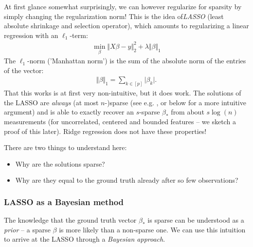 \documentclass{article}
\newcommand{\abs}[1]{\vert #1 \vert}
\newcommand{\norm}[1]{\Vert #1 \Vert}
\begin{document}
At first glance somewhat surprisingly, we can however regularize for sparsity by simply changing the regularization norm! This is the idea of\emph{LASSO} (least absolute shrinkage and selection operator), which amounts to regularizing a linear regression with an $\ell_1$-term:
\begin{align} \label{eq:lasso}
    \min_{\beta} \norm{X\beta-y}_2^2 + \lambda \norm{\beta}_1
\end{align}
The $\ell_1$-norm ('Manhattan norm') is the sum of the absolute norm of the entries of the vector:
\begin{align*}
    \norm{\beta}_1 = \sum_{k \in [p]} \abs{\beta_k}.
\end{align*}
That this works is at first very non-intuitive, but it does work. The solutions of the LASSO are \emph{always} (at most $n$-)sparse (see e.g. \cite[Th.6]{UnserStructure}, or below for a more intuitive argument) and is able to exactly recover an $s$-sparse $\beta_*$ from about $s\log(n)$ measurements (for uncorrelated, centered and bounded features -- we sketch a proof of this later). Ridge regression does not have these properties!

There are two things to understand here: 
\begin{itemize}
    \item Why are the solutions sparse?
    \item Why are they equal to the ground truth already after so few observations?
\end{itemize}

\subsubsection{LASSO as a Bayesian method} The knowledge that the ground truth vector $\beta_*$ is sparse can be understood as a \emph{prior} -- a sparse $\beta$ is more likely than a non-sparse one. We can use this intuition to arrive at the LASSO through a \emph{Bayesian approach}.
\end{document}
